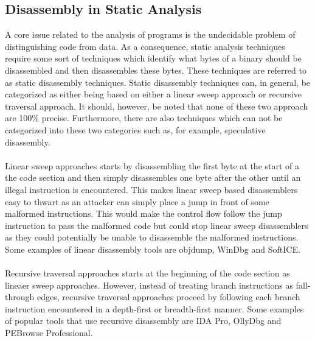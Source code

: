 \documentclass{kththesis}
\begin{document}
\subsection{Disassembly in Static Analysis}
A core issue related to the analysis of programs is the undecidable problem of distinguishing code from data\cite{ABinaryRewriting}. As a consequence, static analysis techniques require some sort of techniques which identify what bytes of a binary should be disassembled and then disassembles these bytes. These techniques are referred to as static disassembly techniques. Static disassembly techniques can, in general, be categorized as either being based on either a linear sweep approach or recursive traversal approach\cite{DisassemblyOfExecutable}. It should, however, be noted that none of these two approach are 100\% precise\cite{ABinaryRewriting}. Furthermore, there are also techniques which can not be categorized into these two categories such as, for example, speculative disassembly\cite{preciseCFG}.
\\ \\
Linear sweep approaches starts by disassembling the first byte at the start of a the code section and then simply disassembles one byte after the other until an illegal instruction is encountered\cite{ABinaryRewriting}. This makes linear sweep based disassemblers easy to thwart as an attacker can simply place a jump in front of some malformed instructions. This would make the control flow follow the jump instruction to pass the malformed code but could stop linear sweep disassemblers as they could potentially be unable to disassemble the malformed instructions\cite{ABinaryRewriting}. Some examples of linear disassembly tools are objdump, WinDbg and SoftICE\cite{ReversingSecretsofReverseEngineering}.
\\ \\ 
Recursive traversal approaches starts at the beginning of the code section as lineaer sweep approaches. However, instead of treating branch instructions as fall-through edges, recursive traversal approaches proceed by following each branch instruction encountered in a depth-first or breadth-first manner. Some examples of popular tools that use recursive disassembly are IDA Pro, OllyDbg and PEBrowse Professional\cite{ReversingSecretsofReverseEngineering}.
\end{document}

